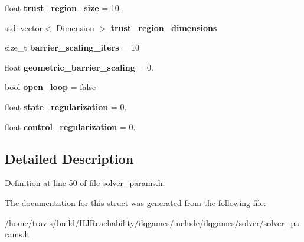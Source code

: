 \begin{DoxyCompactItemize}
\item 
float {\bfseries trust\+\_\+region\+\_\+size} = 10.\hypertarget{structilqgames_1_1_solver_params_af6f8750a857ace4ecb52e85fb7d04021}{}\label{structilqgames_1_1_solver_params_af6f8750a857ace4ecb52e85fb7d04021}

\item 
std\+::vector$<$ Dimension $>$ {\bfseries trust\+\_\+region\+\_\+dimensions}\hypertarget{structilqgames_1_1_solver_params_a5d2025c32b094329c126777e53122a08}{}\label{structilqgames_1_1_solver_params_a5d2025c32b094329c126777e53122a08}

\item 
size\+\_\+t {\bfseries barrier\+\_\+scaling\+\_\+iters} = 10\hypertarget{structilqgames_1_1_solver_params_a0759cbca5370ac06afb2ed3b460ee233}{}\label{structilqgames_1_1_solver_params_a0759cbca5370ac06afb2ed3b460ee233}

\item 
float {\bfseries geometric\+\_\+barrier\+\_\+scaling} = 0.\hypertarget{structilqgames_1_1_solver_params_afe514e86e3439b0b041ce0fda74338bd}{}\label{structilqgames_1_1_solver_params_afe514e86e3439b0b041ce0fda74338bd}

\item 
bool {\bfseries open\+\_\+loop} = false\hypertarget{structilqgames_1_1_solver_params_abb3fe1fbe358304f0c80d75c104bc087}{}\label{structilqgames_1_1_solver_params_abb3fe1fbe358304f0c80d75c104bc087}

\item 
float {\bfseries state\+\_\+regularization} = 0.\hypertarget{structilqgames_1_1_solver_params_a1b78c2eb175f76f675f02bfe5f46e194}{}\label{structilqgames_1_1_solver_params_a1b78c2eb175f76f675f02bfe5f46e194}

\item 
float {\bfseries control\+\_\+regularization} = 0.\hypertarget{structilqgames_1_1_solver_params_a5a517a29fa35ce403cdcfa2e20b85d5c}{}\label{structilqgames_1_1_solver_params_a5a517a29fa35ce403cdcfa2e20b85d5c}

\end{DoxyCompactItemize}


\subsection{Detailed Description}


Definition at line 50 of file solver\+\_\+params.\+h.



The documentation for this struct was generated from the following file\+:\begin{DoxyCompactItemize}
\item 
/home/travis/build/\+H\+J\+Reachability/ilqgames/include/ilqgames/solver/solver\+\_\+params.\+h\end{DoxyCompactItemize}
